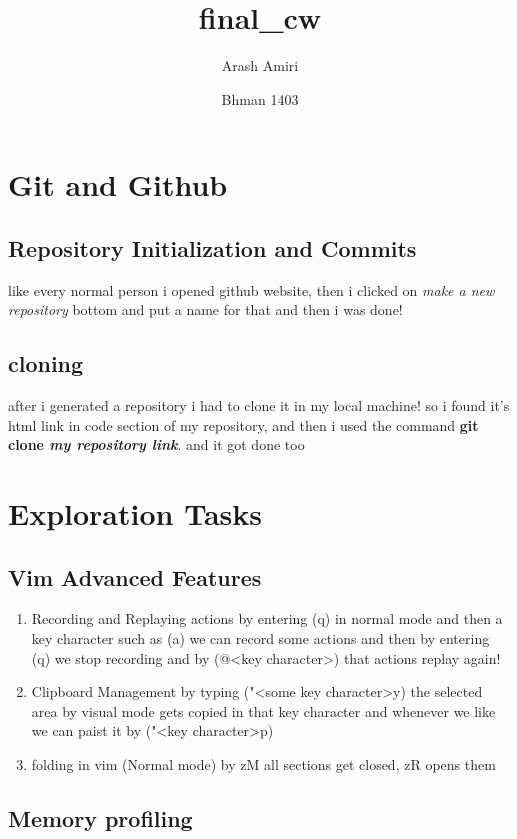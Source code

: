 \documentclass[titlepage]{article}
\title{final\_cw}
\author{Arash Amiri}
\date{Bhman 1403}
\begin{document}
\maketitle
\tableofcontents
\newpage
\section{Git and Github}
\subsection{Repository Initialization and Commits}
like every normal person i opened github website, then i clicked on \textit{make a new repository} bottom and put a name for that and then i was done!
\subsection{cloning}
after i generated a repository i had to clone it in my local machine! so i found it's html link in code section of my repository, and then i used the command \textbf{git clone \textit{my repository link}}. and it got done too
\section{Exploration Tasks}
\subsection{Vim Advanced Features}
\begin{enumerate}
    \item Recording and Replaying actions\newline
    by entering (q) in normal mode and then a key character such as (a) we can record some actions and then by entering (q) we stop recording and by (@<key character>) that actions replay again!
    \item Clipboard Management\newline
    by typing ("<some key character>y) the selected area by visual mode gets copied in that key character and whenever we like we can paist it by ("<key character>p)
    \item folding\newline
    in vim (Normal mode) by zM all sections get closed, zR opens them
\end{enumerate}
\subsection{Memory profiling}
\end{document}
